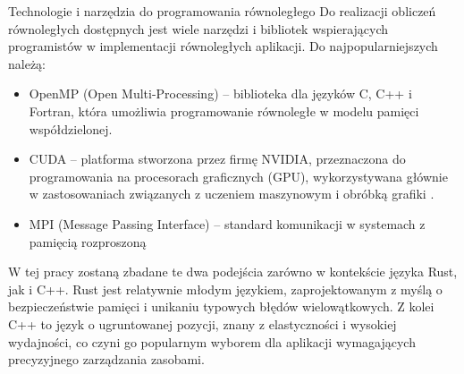 Technologie i narzędzia do programowania równoległego
Do realizacji obliczeń równoległych dostępnych jest wiele narzędzi i bibliotek wspierających programistów w implementacji równoległych aplikacji. Do najpopularniejszych należą:
\begin{itemize}
    \item OpenMP (Open Multi-Processing) – biblioteka dla języków C, C++ i Fortran, która umożliwia programowanie równoległe w modelu pamięci współdzielonej. \cite{ParallelProgramminginC++withOpenMP, ProgramminInOpenMp}
    \item CUDA – platforma stworzona przez firmę NVIDIA, przeznaczona do programowania na procesorach graficznych (GPU), wykorzystywana głównie w zastosowaniach związanych z uczeniem maszynowym i obróbką grafiki \cite{CUDA}.
    \item MPI (Message Passing Interface) – standard komunikacji w systemach z pamięcią rozproszoną
\end{itemize}

W tej pracy zostaną zbadane te dwa podejścia zarówno w kontekście języka Rust, jak i C++. Rust jest relatywnie młodym językiem, zaprojektowanym z myślą o bezpieczeństwie pamięci i unikaniu typowych błędów wielowątkowych. Z kolei C++ to język o ugruntowanej pozycji, znany z elastyczności i wysokiej wydajności, co czyni go popularnym wyborem dla aplikacji wymagających precyzyjnego zarządzania zasobami.

